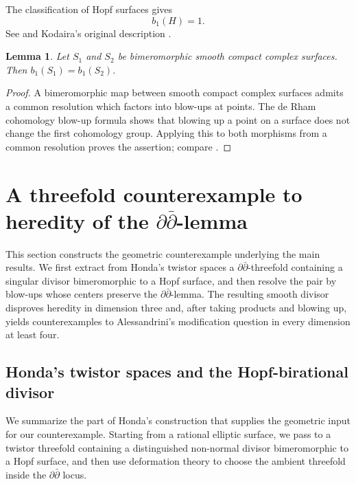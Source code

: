 \documentclass[11pt]{amsart}
\numberwithin{equation}{section}
\theoremstyle{plain}
\newtheorem{lemma}[thm]{Lemma}
\theoremstyle{definition}
\begin{document}
The classification of Hopf surfaces gives
\begin{equation}\label{Hopf-b1}
 b_1(H)=1.
\end{equation}
See \cite[Chapter V, \S~18]{BHPV04} and Kodaira's original
description \cite[pp.~240--243]{Kd66}.

\begin{lemma}\label{surface-bimeromorphic-b1}
Let $S_1$ and $S_2$ be bimeromorphic smooth compact complex surfaces.  Then
$b_1(S_1)=b_1(S_2)$.
\end{lemma}

\begin{proof}
A bimeromorphic map between smooth compact complex surfaces admits a common
resolution which factors into blow-ups at points.  The de Rham cohomology
blow-up formula \cite[Theorem 7.31]{Vi02} shows that blowing up a point on a
surface does not change the first cohomology group.  Applying this to both
morphisms from a common resolution proves the assertion; compare
\cite[Chapter III, \S\S~1--4]{BHPV04}.
\end{proof}

\section{A threefold counterexample to heredity of the
\texorpdfstring{$\partial\bar\partial$}{ddbar}-lemma}
\label{threefold-part}

This section constructs the geometric counterexample underlying the main
results.  We first extract from Honda's twistor spaces a
$\partial\bar\partial$-threefold containing a singular divisor
bimeromorphic to a Hopf surface, and then resolve the pair by blow-ups whose
centers preserve the $\partial\bar\partial$-lemma.  The resulting smooth
divisor disproves heredity in dimension three and, after taking products and
blowing up, yields counterexamples to Alessandrini's modification question
in every dimension at least four.

\subsection{Honda's twistor spaces and the Hopf-birational divisor}
\label{Honda-section}

We summarize the part of Honda's construction that supplies the geometric
input for our counterexample.  Starting from a rational elliptic surface, we
pass to a twistor threefold containing a distinguished non-normal divisor
bimeromorphic to a Hopf surface, and then use deformation theory to choose
the ambient threefold inside the $\partial\bar\partial$ locus.
\end{document}
